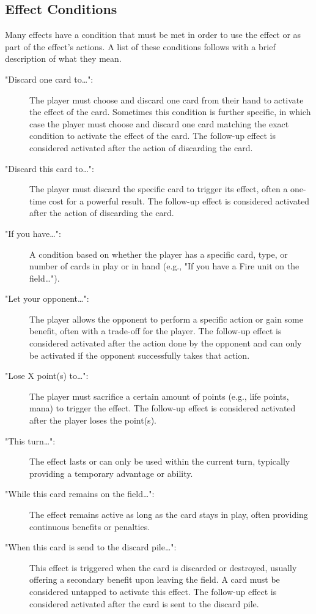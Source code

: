 \subsection{Effect Conditions}
Many effects have a condition that must be met in order to use the effect or as part of the effect's actions. A list of these conditions follows with a brief description of what they mean.
\begin{description}
	\item["Discard one card to\dots":] The player must choose and discard one card from their hand to activate the effect of the card. Sometimes this condition is further specific, in which case the player must choose and discard one card matching the exact condition to activate the effect of the card. The  follow-up effect is considered activated after the action of discarding the card.
	\item["Discard this card to\dots":] The player must discard the specific card to trigger its effect, often a one-time cost for a powerful result. The  follow-up effect is considered activated after the action of discarding the card.
	\item["If you have\dots":] A condition based on whether the player has a specific card, type, or number of cards in play or in hand (e.g., "If you have a Fire unit on the field\dots").
	\item["Let your opponent\dots":] The player allows the opponent to perform a specific action or gain some benefit, often with a trade-off for the player. The follow-up effect is considered activated after the action done by the opponent and can only be activated if the opponent successfully takes that action.
	\item["Lose X point(s) to\dots":] The player must sacrifice a certain amount of points (e.g., life points, mana) to trigger the effect. The follow-up effect is considered activated after the player loses the point(s).
	\item["This turn\dots":] The effect lasts or can only be used within the current turn, typically providing a temporary advantage or ability.
	\item["While this card remains on the field\dots":] The effect remains active as long as the card stays in play, often providing continuous benefits or penalties.
	\item["When this card is send to the discard pile\dots":] This effect is triggered when the card is discarded or destroyed, usually offering a secondary benefit upon leaving the field. A card must be considered untapped to activate this effect. The follow-up effect is considered activated after the card is sent to the discard pile.

\end{description}
